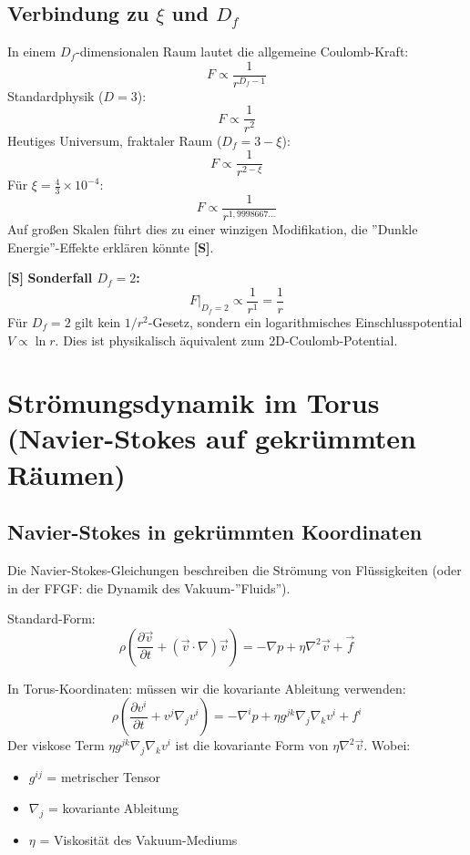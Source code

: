 	\subsection{Verbindung zu \( \xi \) und \( D_f \)}
	In einem \(D_f\)-dimensionalen Raum lautet die allgemeine Coulomb-Kraft:
	\[
	F \propto \frac{1}{r^{D_f - 1}}
	\]
	Standardphysik (\( D = 3 \)):
	\[
	F \propto \frac{1}{r^2}
	\]
	Heutiges Universum, fraktaler Raum (\( D_f = 3 - \xi \)):
	\[
	F \propto \frac{1}{r^{2 - \xi}}
	\]
	Für \( \xi = \frac{4}{3} \times 10^{-4} \):
	\[
	F \propto \frac{1}{r^{1{,}9998667\ldots}}
	\]
	Auf großen Skalen führt dies zu einer winzigen Modifikation, die ''Dunkle Energie''-Effekte erklären könnte \textbf{[S]}.

	\textbf{[S]} \textbf{Sonderfall \(D_f = 2\):}
	\[
	F\big|_{D_f=2} \propto \frac{1}{r^{1}} = \frac{1}{r}
	\]
	Für $D_f = 2$ gilt kein $1/r^2$-Gesetz, sondern ein logarithmisches Einschlusspotential $V \propto \ln r$. Dies ist physikalisch äquivalent zum 2D-Coulomb-Potential.
	
	\section{Strömungsdynamik im Torus (Navier-Stokes auf gekrümmten Räumen)}
	\subsection{Navier-Stokes in gekrümmten Koordinaten}
	Die Navier-Stokes-Gleichungen beschreiben die Strömung von Flüssigkeiten (oder in der FFGF: die Dynamik des Vakuum-''Fluids'').
	
	Standard-Form:
	\[
	\rho\left(\frac{\partial \vec{v}}{\partial t} + (\vec{v} \cdot \nabla) \vec{v}\right) = -\nabla p + \eta \nabla^2 \vec{v} + \vec{f}
	\]
	
	In Torus-Koordinaten: müssen wir die kovariante Ableitung verwenden:
	\[
	\rho\left(\frac{\partial v^i}{\partial t} + v^j \nabla_j v^i\right) = -\nabla^i p + \eta g^{jk} \nabla_j \nabla_k v^i + f^i
	\]
	Der viskose Term $\eta g^{jk}\nabla_j\nabla_k v^i$ ist die kovariante Form von $\eta\nabla^2\vec{v}$.
Wobei:
	\begin{itemize}
		\item \( g^{ij} \) = metrischer Tensor
		\item \( \nabla_j \) = kovariante Ableitung
		\item \( \eta \) = Viskosität des Vakuum-Mediums
	\end{itemize}
	
